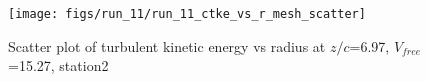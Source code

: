 \begin{figure}[H]
\centering
\texttt{[image: figs/run\_11/run\_11\_ctke\_vs\_r\_mesh\_scatter]}
\caption{Scatter plot of turbulent kinetic energy vs radius at $z/c$=6.97, $V_{free}$=15.27, station2}
\label{fig:run_11_ctke_vs_r_mesh_scatter}
\end{figure}


